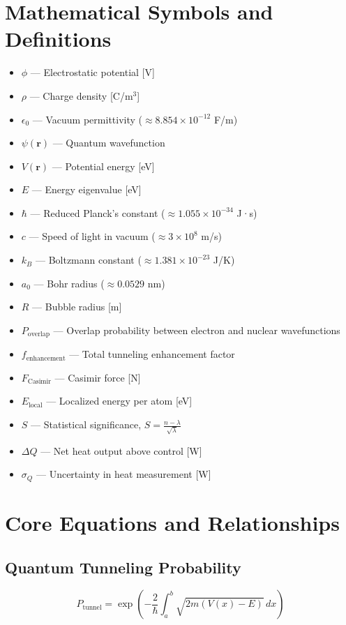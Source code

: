     \appendix
    \section{Mathematical Symbols and Definitions}
    
    \begin{itemize}
        \item $\phi$ — Electrostatic potential [V]
        \item $\rho$ — Charge density [C/m$^3$]
        \item $\epsilon_0$ — Vacuum permittivity ($\approx 8.854 \times 10^{-12}$ F/m)
        \item $\psi(\mathbf{r})$ — Quantum wavefunction
        \item $V(\mathbf{r})$ — Potential energy [eV]
        \item $E$ — Energy eigenvalue [eV]
        \item $\hbar$ — Reduced Planck’s constant ($\approx 1.055 \times 10^{-34}$ J·s)
        \item $c$ — Speed of light in vacuum ($\approx 3 \times 10^8$ m/s)
        \item $k_B$ — Boltzmann constant ($\approx 1.381 \times 10^{-23}$ J/K)
        \item $a_0$ — Bohr radius ($\approx 0.0529$ nm)
        \item $R$ — Bubble radius [m]
        \item $P_{\text{overlap}}$ — Overlap probability between electron and nuclear wavefunctions
        \item $f_{\text{enhancement}}$ — Total tunneling enhancement factor
        \item $F_{\text{Casimir}}$ — Casimir force [N]
        \item $E_{\text{local}}$ — Localized energy per atom [eV]
        \item $S$ — Statistical significance, $S = \frac{n - \lambda}{\sqrt{\lambda}}$
        \item $\Delta Q$ — Net heat output above control [W]
        \item $\sigma_Q$ — Uncertainty in heat measurement [W]
    \end{itemize}
    
    \section{Core Equations and Relationships}
    
    \subsection*{Quantum Tunneling Probability}
    \[
    P_{\text{tunnel}} = \exp\left(-\frac{2}{\hbar} \int_{a}^{b} \sqrt{2m(V(x) - E)} \, dx\right)
    \]
    
